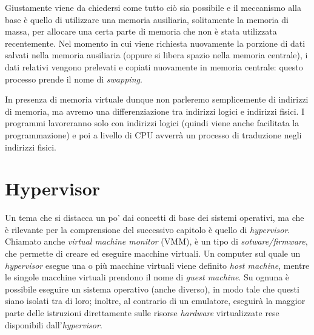 Giustamente viene da chiedersi come tutto ciò sia possibile e il meccanismo alla base è quello di utilizzare una memoria ausiliaria, solitamente la memoria di massa, per allocare una certa parte di memoria che non è stata utilizzata recentemente. Nel momento in cui viene richiesta nuovamente la porzione di dati salvati nella memoria ausiliaria (oppure si libera spazio nella memoria centrale), i dati relativi vengono prelevati e copiati nuovamente in memoria centrale: questo processo prende il nome di \textit{swapping}. 

In presenza di memoria virtuale dunque non parleremo semplicemente di indirizzi di memoria, ma avremo una differenziazione tra indirizzi logici e indirizzi fisici. I programmi lavoreranno solo con indirizzi logici (quindi viene anche facilitata la programmazione) e poi a livello di CPU avverrà un processo di traduzione negli indirizzi fisici.

\section{Hypervisor}
Un tema che si distacca un po' dai concetti di base dei sistemi operativi, ma che è rilevante per la comprensione del successivo capitolo è quello di \textit{hypervisor}. Chiamato anche \textit{virtual machine monitor} (VMM), è un tipo di \textit{sotware/firmware}, che permette di creare ed eseguire macchine virtuali. Un computer sul quale un \textit{hypervisor} esegue una o più macchine virtuali viene definito \textit{host machine}, mentre le singole macchine virtuali prendono il nome di \textit{guest machine}. Su ognuna è possibile eseguire un sistema operativo (anche diverso), in modo tale che questi siano isolati tra di loro; inoltre, al contrario di un emulatore, eseguirà la maggior parte delle istruzioni direttamente sulle risorse \textit{hardware} virtualizzate rese disponibili dall'\textit{hypervisor}.